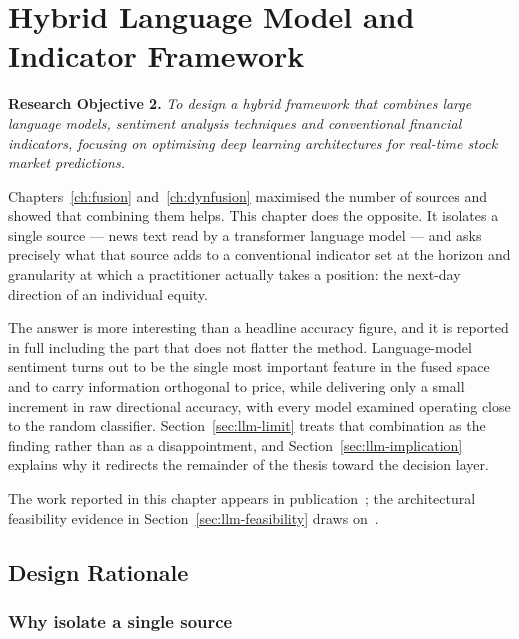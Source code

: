 \chapter{Hybrid Language Model and Indicator Framework}
\label{ch:llm}

\textbf{Research Objective 2.} \emph{To design a hybrid framework that combines large language
models, sentiment analysis techniques and conventional financial indicators, focusing on
optimising deep learning architectures for real-time stock market predictions.}

\vspace{0.4em}
Chapters~\ref{ch:fusion} and~\ref{ch:dynfusion} maximised the number of sources and showed that
combining them helps. This chapter does the opposite. It isolates a single source --- news text
read by a transformer language model --- and asks precisely what that source adds to a
conventional indicator set at the horizon and granularity at which a practitioner actually
takes a position: the next-day direction of an individual equity.

The answer is more interesting than a headline accuracy figure, and it is reported in full
including the part that does not flatter the method. Language-model sentiment turns out to be
the single most important feature in the fused space and to carry information orthogonal to
price, while delivering only a small increment in raw directional accuracy, with every model
examined operating close to the random classifier. Section~\ref{sec:llm-limit} treats that
combination as the finding rather than as a disappointment, and Section~\ref{sec:llm-implication}
explains why it redirects the remainder of the thesis toward the decision layer.

The work reported in this chapter appears in publication~; the architectural
feasibility evidence in Section~\ref{sec:llm-feasibility} draws on~.

\section{Design Rationale}
\label{sec:llm-rationale}

\subsection{Why isolate a single source}

